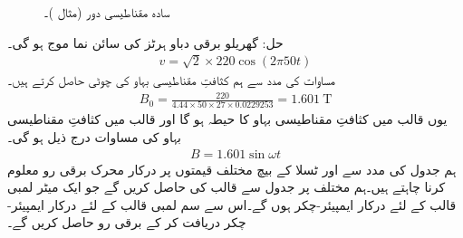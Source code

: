 \begin{figure}
\centering
{}%
\caption{سادہ مقناطیسی دور (مثال )۔}
\label{شکل_مقناطیسی__سادہ_مقناطیسی_دور_بغیر_درز_دوبارہ}
\end{figure}
حل:\quad
گھریلو برقی دباو  ہرٹز کی سائن نما موج ہو گی۔
\begin{align}
v=\sqrt{2} \times 220 \cos (2 \pi  50 t)
\end{align}
مساوات   کی مدد سے ہم کثافتِ مقناطیسی بہاو کی چوٹی حاصل کرتے ہیں۔
\begin{align}
B_0=\frac{220}{4.44 \times 50 \times 27 \times 0.0229253}=\SI{1.601}{\tesla}
\end{align}
یوں قالب میں کثافتِ مقناطیسی بہاو کا حیطہ    ہو گا اور   قالب میں کثافتِ مقناطیسی بہاو کی مساوات درج ذیل ہو گی۔
\begin{align}\label{مساوات_مقناطیسی_دور_سائن_نما_کثافت_بہاو}
B=1.601 \sin \omega t
\end{align}
ہم جدول کی مدد سے    اور  ٹسلا کے بیچ  مختلف قیمتوں پر درکار محرک برقی رو  معلوم کرنا چاہتے ہیں۔ہم مختلف  پر جدول  سے قالب کی  حاصل کریں گے جو  ایک میٹر لمبی قالب کے لئے درکار ایمپیئر-چکر ہوں گے۔اس سے  سم لمبی قالب کے لئے درکار ایمپیئر-چکر  دریافت کر کے برقی رو حاصل کریں گے۔

